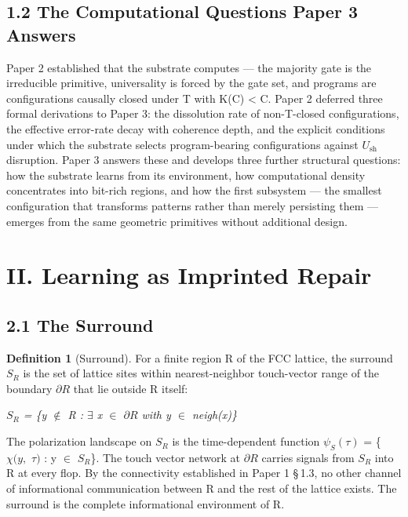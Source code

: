 \documentclass[11pt,oneside]{report}
\theoremstyle{definition}
\newtheorem{definition}[theorem]{Definition}
\theoremstyle{remark}
\begin{document}
\subsection*{1.2 The Computational Questions Paper 3 Answers}

Paper 2 established that the substrate computes --- the majority gate is
the irreducible primitive, universality is forced by the gate set, and
programs are configurations causally closed under T with K(C)
\textless{} \textbar C\textbar. Paper 2 deferred three formal
derivations to Paper 3: the dissolution rate of non-T-closed
configurations, the effective error-rate decay with coherence depth, and
the explicit conditions under which the substrate selects
program-bearing configurations against \ensuremath{U_{\mathrm{sh}}} disruption. Paper 3 answers
these and develops three further structural questions: how the substrate
learns from its environment, how computational density concentrates into
bit-rich regions, and how the first subsystem --- the smallest
configuration that transforms patterns rather than merely persisting
them --- emerges from the same geometric primitives without additional
design.

\section*{II. Learning as Imprinted Repair}

\subsection*{2.1 The Surround}

\begin{definition}[Surround]
For a finite region R of the FCC lattice, the
surround \ensuremath{S_{R}} is the set of lattice sites within nearest-neighbor
touch-vector range of the boundary \ensuremath{\partial R} that lie outside R itself:
\end{definition}

\emph{\ensuremath{S_{R}} = \{y \ensuremath{\notin} R : \ensuremath{\exists} x \ensuremath{\in} \ensuremath{\partial R} with y \ensuremath{\in} neigh(x)\}}

The polarization landscape on \ensuremath{S_{R}} is the time-dependent function
\ensuremath{\psi_{S}(\tau )} = \{\ensuremath{\chi (y,} \ensuremath{\tau )} : y \ensuremath{\in} \ensuremath{S_{R}}\}. The touch vector network at \ensuremath{\partial R} carries
signals from \ensuremath{S_{R}} into R at every flop. By the connectivity established
in Paper 1 \S\,1.3, no other channel of informational communication between
R and the rest of the lattice exists. The surround is the complete
informational environment of R.
\end{document}
